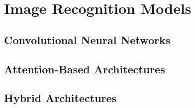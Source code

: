 \section*{Image Recognition Models}
\label{rel:sec_imrecon}

\subsection*{Convolutional Neural Networks}
\label{rel:sub_cnn}

\subsection*{Attention-Based Architectures}
\label{rel:sub_att}

\subsection*{Hybrid Architectures}
\label{rel:sub_hybrid}